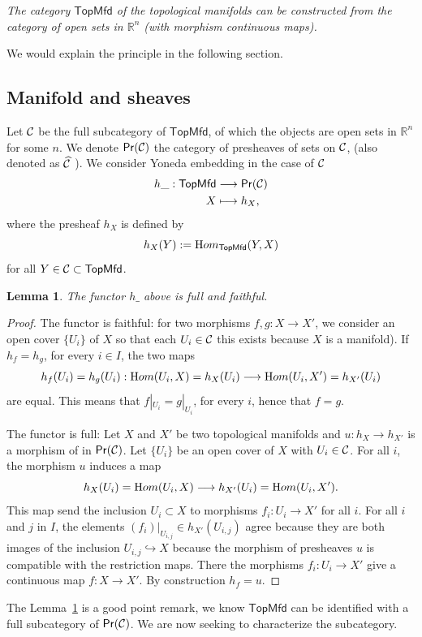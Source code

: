 \documentclass{tufte-book} %
\numberwithin{dummy}{section}
\newtheorem{lemma}[thm]{Lemma}
\renewcommand{\hom}{{\textnormal Hom}}
\newcommand{\reals}{\mathbb R}
\newcommand{\calc}{{\cal C}}
\newcommand{\lrta}{\longrightarrow}
\newcommand{\inj}{\hookrightarrow}
\begin{document}
\textit{The category $\mathsf{TopMfd}$ of the topological manifolds can be constructed from the category of open sets in $\reals^n$ (with morphism continuous maps).}

We would explain the principle in the following section.
\subsection{Manifold and sheaves}
Let $\calc$ be the full subcategory of $\mathsf{TopMfd}$, of which the objects are open sets in $\reals^n$ for some $n$. We denote $\mathsf{Pr}(\calc)$ the category of presheaves of sets on $\calc$, (also denoted as $\widehat{\calc}$ ). We consider Yoneda embedding in the case of $\calc$
$$
\begin{aligned}
h\_: \mathsf{TopMfd}&\lrta \mathsf{Pr}(\calc)\\
X&\longmapsto h_X,
\end{aligned}
$$
where the presheaf $h_X$ is defined by 
$$
h_X(Y):=\hom_{\mathsf{TopMfd}}(Y,X)
$$
for all $Y\in \calc\subset \mathsf{TopMfd}$.

\begin{lemma}\label{lem:yoneda_full_faithful}
The functor $h\_$ above is full and faithful.
\end{lemma}
\begin{proof}
The functor is faithful: for two morphisms $f,g:X\lrta X'$, we consider an open cover $\{U_i\}$ of $X$ so that each $U_i\in\calc$ this exists because $X$ is a manifold). If $h_f=h_g$, for every $i\in I$, the two maps 
$$
h_f(U_i)=h_g(U_i):\hom(U_i, X)=h_X(U_i)\lrta \hom(U_i, X')=h_{X'}(U_i)
$$
are equal. This means that $f|_{U_i}=g|_{U_i}$, for every $i$, hence that $f=g$. 

The functor is full: Let $X$ and $X'$ be two topological manifolds and $u:h_X\lrta h_{X'}$ is a morphism of in $\mathsf{Pr}(\calc)$. Let $\{U_i\}$ be an open cover of $X$ with $U_i\in \calc$. For all $i$, the morphism $u$ induces a map 
$$
h_X(U_i)=\hom(U_i,X)\lrta h_{X'}(U_i)=\hom(U_i,X').
$$
This map send the 
inclusion $U_i\subset X$ to morphisms $f_i:U_i\lrta X'$ for all $i$.  For all $i$ and $j$ in $I$, the elements $(f_i)|_{U_{i,j}}\in h_{X'}(U_{i,j})$ agree because they are both images of the inclusion $U_{i,j}\inj X$ because the morphism of presheaves $u$ is compatible with the restriction maps. There the morphisms $f_i:U_i\lrta X'$ give a continuous map $f:X\lrta X'$. By construction $h_f=u$.
\end{proof}
The Lemma~\ref{lem:yoneda_full_faithful} is a good point remark, we know $\mathsf{TopMfd}$ can be identified with a full subcategory of $\mathsf{Pr}(\calc)$. We are now seeking to characterize the subcategory.
\end{document}
